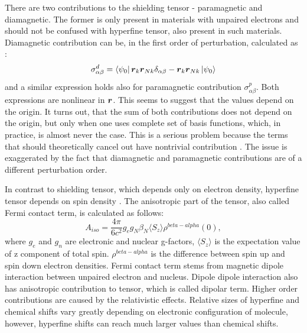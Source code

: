 \documentclass[openany, longbibliography,slovene,a4paper,12pt]{article}
\def\vec#1{\mbox{\boldmath$#1$}}
\begin{document}
  There are two contributions to the shielding tensor - paramagnetic and
  diamagnetic. The former is only present in materials with unpaired electrons
  and should not be confused with hyperfine tensor, also present in such materials.
  Diamagnetic contribution can be, in the first order of perturbation, calculated as \cite{chemic_shift_tensor_review}:
  \begin{equation}
    \sigma^d_{\alpha \beta}=\bra{\psi_0}\vec{r}_k \vec{r}_{Nk}\delta_{\alpha\beta}- \vec{r}_{k}\vec{r}_{Nk} \ket{\psi_0}
  \end{equation}
  and a similar expression holds also for paramagnetic contribution $\sigma^p_{\alpha\beta}$. Both
  expressions are nonlinear in $\vec r$. This seems to suggest that the values
  depend on the origin. It turns out, that the sum of both contributions does
  not depend on the origin, but only when one uses complete set of basis functions,
  which, in practice, is almost never the case. This is a serious problem
  because the terms that should theoretically cancel out have nontrivial
  contribution \cite{chemic_shift_tensor_review}. The issue is exaggerated by
  the fact that diamagnetic and paramagnetic contributions are of a different
  perturbation order.

  In contrast to shielding tensor, which depends only on electron density,
  hyperfine tensor depends on spin density \cite{calcul_hyper_tensor_param_nmr}.
  The anisotropic part of the tensor, also called Fermi contact term, is
  calculated as follows:
  \begin{equation}
    A_{iso}=\frac{4\pi}{6c^2}g_eg_N\beta_N\langle S_z \rangle \rho^{beta-alpha}(0),
    \end{equation}
where $g_e$ and $g_n$ are electronic and nuclear g-factors, $\langle S_z
\rangle$ is the expectation value of z component of total spin.
$\rho^{beta-alpha}$ is the difference between spin up and spin down electron
densities. Fermi contact term stems from magnetic dipole interaction between unpaired electron and nucleus. Dipole dipole interaction
also has anisotropic contribution to tensor, which is called dipolar term. Higher
order contributions are caused by the relativistic effects.
Relative sizes of hyperfine and chemical shifts vary greatly depending on
electronic configuration of molecule, however,
hyperfine shifts can reach much larger values than chemical shifts. 
\end{document}
